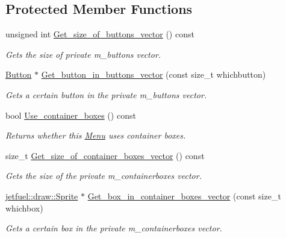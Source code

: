 \subsection*{Protected Member Functions}
\begin{DoxyCompactItemize}
\item 
unsigned int \hyperlink{classjetfuel_1_1gui_1_1Menu_abb5c42472d2bcc1338d694ce6cb35a13}{Get\+\_\+size\+\_\+of\+\_\+buttons\+\_\+vector} () const
\begin{DoxyCompactList}\small\item\em Gets the size of private m\+\_\+buttons vector. \end{DoxyCompactList}\item 
\hyperlink{classjetfuel_1_1gui_1_1Button}{Button} $\ast$ \hyperlink{classjetfuel_1_1gui_1_1Menu_a82ebabbd98cac6a1adf4ade59af57536}{Get\+\_\+button\+\_\+in\+\_\+buttons\+\_\+vector} (const size\+\_\+t whichbutton)
\begin{DoxyCompactList}\small\item\em Gets a certain button in the private m\+\_\+buttons vector. \end{DoxyCompactList}\item 
bool \hyperlink{classjetfuel_1_1gui_1_1Menu_ac30478425fc7feea544bad7f4dbad560}{Use\+\_\+container\+\_\+boxes} () const
\begin{DoxyCompactList}\small\item\em Returns whether this \hyperlink{classjetfuel_1_1gui_1_1Menu}{Menu} uses container boxes. \end{DoxyCompactList}\item 
size\+\_\+t \hyperlink{classjetfuel_1_1gui_1_1Menu_a93d17a47970afa6375eb4d9913338481}{Get\+\_\+size\+\_\+of\+\_\+container\+\_\+boxes\+\_\+vector} () const
\begin{DoxyCompactList}\small\item\em Gets the size of the private m\+\_\+containerboxes vector. \end{DoxyCompactList}\item 
\hyperlink{classjetfuel_1_1draw_1_1Sprite}{jetfuel\+::draw\+::\+Sprite} $\ast$ \hyperlink{classjetfuel_1_1gui_1_1Menu_a9f4a74b0103a6912e9236d1a66068aca}{Get\+\_\+box\+\_\+in\+\_\+container\+\_\+boxes\+\_\+vector} (const size\+\_\+t whichbox)
\begin{DoxyCompactList}\small\item\em Gets a certain box in the private m\+\_\+containerboxes vector. \end{DoxyCompactList}\item 

\end{DoxyCompactItemize}
